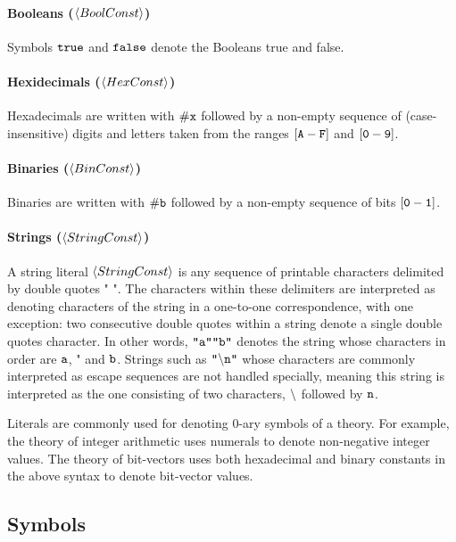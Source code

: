 \documentclass[english,a4paper,10pt]{article}
\begin{document}
\paragraph{Booleans ($\left\langle BoolConst\right\rangle$)}
Symbols $\texttt{true}$ and $\texttt{false}$ denote the Booleans true and false.

\paragraph{Hexidecimals ($\left\langle HexConst\right\rangle$)}
Hexadecimals are written with ${\tt \#x}$
followed by a non-empty sequence of (case-insensitive) 
digits and letters taken from the ranges $\left[{\tt A}-{\tt F}\right]$
and $\left[{\tt 0}-{\tt 9}\right]$.

\paragraph{Binaries ($\left\langle BinConst\right\rangle$)}
Binaries are written with ${\tt \#b}$
followed by a non-empty sequence of bits $\left[{\tt 0}-{\tt 1}\right]$.

\paragraph{Strings ($\left\langle StringConst\right\rangle$)}
A string literal $\left\langle StringConst\right\rangle$
is any sequence of printable characters
delimited by double quotes $\texttt{"}$ $\texttt{"}$.
The characters within these delimiters
are interpreted as denoting characters of the string in a one-to-one correspondence,
with one exception:
two consecutive double quotes within a string
denote a single double quotes character.
In other words, $\texttt{"}{\tt a}\texttt{"}\texttt{"}{\tt b}\texttt{"}$ denotes the string
whose characters in order are ${\tt a}$, $\texttt{"}$ and ${\tt b}$.
Strings such as $\texttt{"}{\tt \backslash n}\texttt{"}$ whose characters are commonly
interpreted as escape sequences are not handled specially,
meaning this string is interpreted 
as the one consisting of two characters, ${\tt \backslash}$ followed by ${\tt n}$.

\noindent
Literals are commonly
used for denoting 0-ary symbols of a theory.
For example, 
the theory of integer arithmetic 
uses numerals to denote non-negative integer values.
The theory of bit-vectors uses both
hexadecimal and binary constants in the above syntax
to denote bit-vector values.

\subsection{Symbols}
\end{document}
